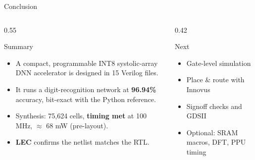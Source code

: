 \documentclass[aspectratio=169,10pt,t]{beamer}
\begin{document}
\begin{frame}{Conclusion}
  \begin{columns}[T]
    \begin{column}{0.55\textwidth}
      \begin{block}{Summary}
        \small
        \begin{itemize}\setlength{\itemsep}{3pt}
          \item A compact, programmable INT8 systolic-array DNN accelerator is designed in 15 Verilog files.
          \item It runs a digit-recognition network at \textbf{96.94\%} accuracy, bit-exact with the Python reference.
          \item Synthesis: 75,624 cells, \textbf{timing met} at 100 MHz, $\approx$ 68 mW (pre-layout).
          \item \textbf{LEC} confirms the netlist matches the RTL.
        \end{itemize}
      \end{block}
    \end{column}
    \begin{column}{0.42\textwidth}
      \begin{block}{Next}
        \small
        \begin{itemize}\setlength{\itemsep}{3pt}
          \item Gate-level simulation
          \item Place \& route with Innovus
          \item Signoff checks and GDSII
          \item Optional: SRAM macros, DFT, PPU timing
        \end{itemize}
      \end{block}
    \end{column}
  \end{columns}
\end{frame}
\end{document}
